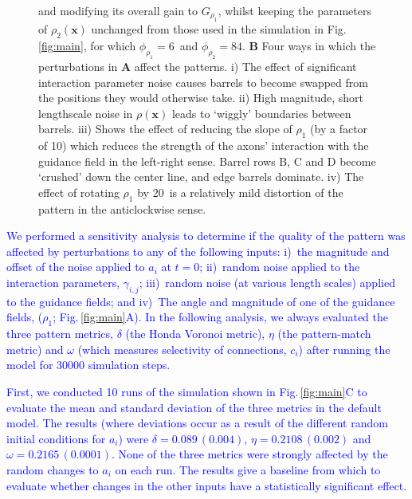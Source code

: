 \documentclass[9pt,lineno,draft]{elife}
\newcommand{\cmnt}[1]{\textcolor{blue}{#1}}
\newcommand{\mb}[1]{\mathbf{#1}}
\begin{document}
\begin{figure}
\begin{fullwidth}
{{        and modifying its overall gain to $G_{\rho_1}$, whilst keeping the
        parameters of $\rho_2(\mb{x})$
        unchanged from those used in the simulation in
        Fig.\,\ref{fig:main}, for which $\phi_{\rho_1}=6$\textdegree~and
        $\phi_{\rho_2}=84$\textdegree.
        \textbf{B} Four ways in which the perturbations in \textbf{A} affect
        the patterns. i) The effect of significant interaction parameter noise
        causes barrels to become swapped from the positions they would
        otherwise take. ii) High magnitude, short lengthscale noise in
        $\rho(\mb{x})$ leads to `wiggly' boundaries between barrels. iii)
        Shows the effect of reducing the slope of $\rho_1$ (by a factor of 10)
        which reduces the strength of the axons' interaction with the guidance
        field in the left-right sense. Barrel rows B, C and D become `crushed'
        down the center line, and edge barrels dominate. iv) The effect of
        rotating $\rho_1$ by 20\textdegree~is a relatively mild distortion of
        the pattern in the anticlockwise sense.
      }
    }
    \label{fig:sens}
  \end{fullwidth}
\end{figure}

\cmnt{We performed a sensitivity analysis to determine if the quality of the
  pattern was affected by perturbations to any of the following inputs:
%
  i)~the magnitude and offset of the noise applied to $a_i$ at $t=0$;
%
  ii)~random noise applied to the interaction parameters, $\gamma_{i,j}$;
%
  iii)~random noise (at various length scales) applied to the guidance fields;
%
  and
%
  iv)~The angle and magnitude of one of the guidance fields, ($\rho_1$;
  Fig.\,\ref{fig:main}A).
%
  In the following analysis, we always evaluated the three pattern metrics,
  $\delta$ (the Honda Voronoi metric), $\eta$ (the pattern-match metric) and
  $\omega$ (which measures selectivity of connections, $c_i$) after running
  the model for 30000 simulation steps.}

\cmnt{First, we conducted 10 runs of the simulation shown in
  Fig.\,\ref{fig:main}C to evaluate the mean and standard deviation of the
  three metrics in the default model. The
  results (where deviations occur as a result of the different random initial
  conditions for $a_i$) were $\delta=0.089\,(0.004)$, $\eta=0.2108\,(0.002)$ and
  $\omega=0.2165\,(0.0001)$. None of the three metrics were strongly affected
  by the random changes to $a_i$ on each run. The results give a baseline from
  which to evaluate whether changes in the other inputs have a statistically
  significant effect.}
\end{document}
